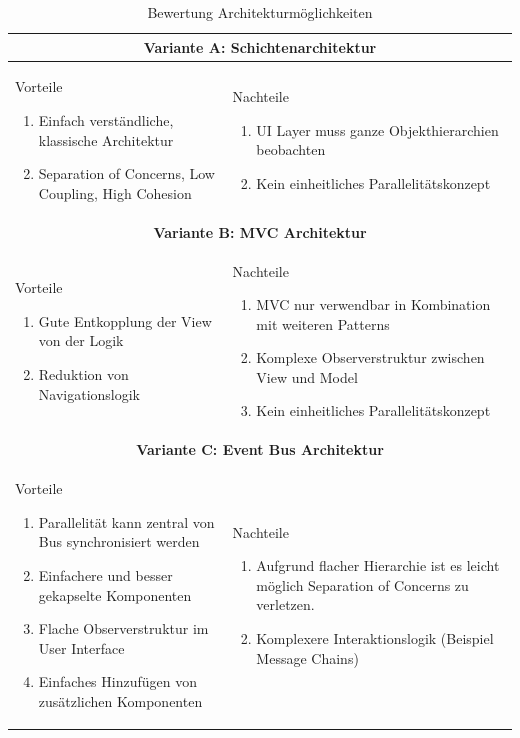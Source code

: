 \begin{table}[H]
\begin{tabular}{|p{}|p{}|}
 \hline 
\multicolumn{2}{|c|}{\textbf{Variante A: Schichtenarchitektur}}\\ \hline 
Vorteile
\begin{enumerate}
\item Einfach verständliche, klassische Architektur
\item Separation of Concerns, Low Coupling, High Cohesion
\end{enumerate} & 
Nachteile
\begin{enumerate}
\item \ac{UI} Layer muss ganze Objekthierarchien beobachten
\item Kein einheitliches Parallelitätskonzept
\end{enumerate}
\\ \hline

\multicolumn{2}{|c|}{\textbf{Variante B: MVC Architektur}}\\ \hline 
Vorteile
\begin{enumerate}
\item Gute Entkopplung der View von der Logik
\item Reduktion von Navigationslogik
\end{enumerate} &
Nachteile
\begin{enumerate}
\item \ac{MVC} nur verwendbar in Kombination mit weiteren Patterns
\item Komplexe Observerstruktur zwischen View und Model
\item Kein einheitliches Parallelitätskonzept
\end{enumerate}
\\ \hline

\multicolumn{2}{|c|}{\textbf{Variante C: Event Bus Architektur}}\\ \hline 
Vorteile
\begin{enumerate}
\item Parallelität kann zentral von Bus synchronisiert werden
\item Einfachere und besser gekapselte Komponenten
\item Flache Observerstruktur im User Interface
\item Einfaches Hinzufügen von zusätzlichen Komponenten
\end{enumerate} &
Nachteile
\begin{enumerate}
\item Aufgrund flacher Hierarchie ist es leicht möglich Separation of Concerns zu verletzen.
\item Komplexere Interaktionslogik (Beispiel Message Chains)
\end{enumerate}
\\ \hline
\end{tabular}
\caption{Bewertung Architekturmöglichkeiten}
\end{table}

